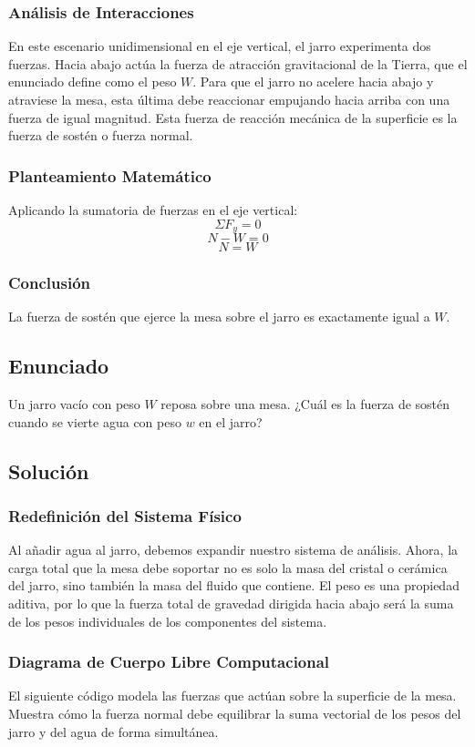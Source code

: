 \documentclass[12pt,letterpaper]{article}
\begin{document}
\subsubsection*{Análisis de Interacciones}
En este escenario unidimensional en el eje vertical, el jarro experimenta dos fuerzas. Hacia abajo actúa la fuerza de atracción gravitacional de la Tierra, que el enunciado define como el peso $W$. Para que el jarro no acelere hacia abajo y atraviese la mesa, esta última debe reaccionar empujando hacia arriba con una fuerza de igual magnitud. Esta fuerza de reacción mecánica de la superficie es la fuerza de sostén o fuerza normal.

\subsubsection*{Planteamiento Matemático}
Aplicando la sumatoria de fuerzas en el eje vertical:
$$\Sigma F_{y} = 0$$
$$N - W = 0$$
$$N = W$$

\subsubsection*{Conclusión}
La fuerza de sostén que ejerce la mesa sobre el jarro es exactamente igual a $W$.

\newpage

\subsection*{Enunciado}
Un jarro vacío con peso $W$ reposa sobre una mesa. ¿Cuál es la fuerza de sostén cuando se vierte agua con peso $w$ en el jarro?

\subsection*{Solución}

\subsubsection*{Redefinición del Sistema Físico}
Al añadir agua al jarro, debemos expandir nuestro sistema de análisis. Ahora, la carga total que la mesa debe soportar no es solo la masa del cristal o cerámica del jarro, sino también la masa del fluido que contiene. El peso es una propiedad aditiva, por lo que la fuerza total de gravedad dirigida hacia abajo será la suma de los pesos individuales de los componentes del sistema.

\subsubsection*{Diagrama de Cuerpo Libre Computacional}
El siguiente código modela las fuerzas que actúan sobre la superficie de la mesa. Muestra cómo la fuerza normal debe equilibrar la suma vectorial de los pesos del jarro y del agua de forma simultánea.
\end{document}
